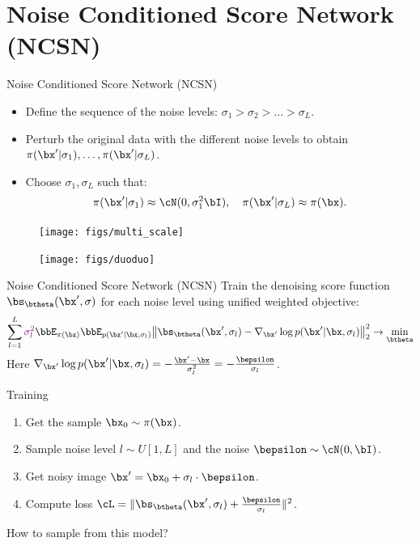 \section{Noise Conditioned Score Network (NCSN)}
\begin{frame}{Noise Conditioned Score Network (NCSN)}
	\begin{itemize}
		\item Define the sequence of the noise levels: $\sigma_1 > \sigma_2 > \dots > \sigma_L$.
		\item Perturb the original data with the different noise levels to obtain $\pi(\bx' | \sigma_1), \dots, \pi(\bx' | \sigma_L)$.
		\item Choose $\sigma_1, \sigma_L$ such that:
		\[
			\pi(\bx' | \sigma_1) \approx \cN(0, \sigma_1^2 \bI), \quad \pi(\bx' | \sigma_L) \approx \pi(\bx).
		\]
	\end{itemize}
	\begin{figure}
		\texttt{[image: figs/multi\_scale]}
	\end{figure}
	\begin{figure}
		\texttt{[image: figs/duoduo]}
	\end{figure}
\end{frame}
\begin{frame}{Noise Conditioned Score Network (NCSN)}
	Train the denoising score function $\bs_{\btheta}(\bx', \sigma)$ for each noise level using unified weighted objective:
	\vspace{-0.2cm}
	\[
		\sum_{l=1}^L {\color{violet}\sigma_l^2} \bbE_{\pi(\bx)} \bbE_{p(\bx' | \bx, \sigma_l)}\bigl\| \bs_{\btheta}(\bx', \sigma_l) - \nabla_{\bx'} \log p(\bx' | \bx, \sigma_l) \bigr\|^2_2 \rightarrow \min_{\btheta}
	\]
	Here $\nabla_{\bx'} \log p(\bx' | \bx, \sigma_l) = - \frac{\bx' - \bx}{\sigma_l^2} = - \frac{\bepsilon}{\sigma_l}$.
	\begin{block}{Training}
		\begin{enumerate}
			\item Get the sample $\bx_0 \sim \pi(\bx)$.
			\item Sample noise level $l \sim U[1, L]$ and the noise $\bepsilon \sim \cN(0, \bI)$.
			\item Get noisy image $\bx' = \bx_0 + \sigma_l \cdot \bepsilon$.
			\item Compute loss $ \cL = \| \bs_{\btheta}(\bx', \sigma_l) + \frac{\bepsilon}{\sigma_l} \|^2 $.
		\end{enumerate}
	\end{block}
	How to sample from this model?
\end{frame}
